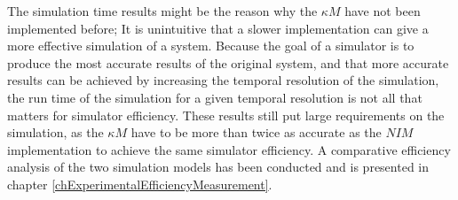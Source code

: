

		The simulation time results might be the reason why the $\kappa M$ have not been implemented before;
			It is unintuitive that a slower implementation can give a more effective simulation of a system.
		Because the goal of a simulator is to produce the most accurate results of the original system, and that more accurate results can be achieved by increasing the temporal resolution of the simulation,
			the run time of the simulation for a given temporal resolution is not all that matters for simulator efficiency.
		These results still put large requirements on the simulation, as the $\kappa M$ have to be more than twice as accurate as the $NIM$ implementation to achieve the same simulator efficiency.
		A comparative efficiency analysis of the two simulation models has been conducted and is presented in chapter \ref{chExperimentalEfficiencyMeasurement}.






